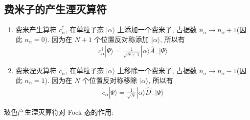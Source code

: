 \documentclass[../../main.tex]{subfiles}
\begin{document}
\subsection{费米子的产生湮灭算符}
\begin{enumerate}
  \item 费米产生算符 $c_{\alpha}^{\dagger}$, 在单粒子态 $|\alpha\rangle$ 上添加一个费米子, 占据数 $n_{\alpha}\rightarrow n_{\alpha} + 1$(因此 $n_{\alpha}=0$). 因为在 $N+1$ 个位置反对称添加 $|\alpha\rangle$, 所以有
  \begin{align*}
    c_{\alpha}^{\dagger}|\Psi\rangle = \frac{1}{\sqrt{N+1}}|\alpha\rangle\hat{A}_{-}|\Psi\rangle
  \end{align*}
  \item 费米湮灭算符 $c_{\alpha}$, 在单粒子态 $|\alpha\rangle$ 上移除一个费米子, 占据数 $n_{\alpha}\rightarrow n_{\alpha} - 1$(因此 $n_{\alpha}=1$). 因为在 $N$ 个位置反对称移除 $|\alpha\rangle$, 所以有
  \begin{align*}
    c_{\alpha}|\Psi\rangle = \frac{1}{\sqrt{N}}|\alpha\rangle\hat{D}_{-}|\Psi\rangle
  \end{align*}
\end{enumerate}
玻色产生湮灭算符对 Fock 态的作用:
\end{document}
